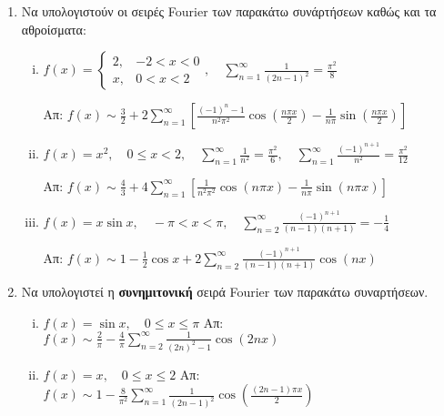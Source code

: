 \begin{enumerate}
  \item Να υπολογιστούν οι σειρές Fourier των παρακάτω συνάρτήσεων καθώς και 
    τα αθροίσματα:
    \begin{enumerate}[i)]
      \item $ f(x) = 
        \begin{cases}
          2, & -2<x<0 \\
          x, & 0<x<2
        \end{cases}, \quad \sum_{n=1}^{\infty} \frac{1}{(2n-1)^{2}} = \frac{\pi ^{2}}{8}$

        \hfill Απ: $ f(x) \sim \frac{3}{2} + 2 \sum_{n=1}^{\infty}
        \left[\frac{(-1)^{n}-1}{n^{2} \pi ^{2}} \cos{\left(\frac{n \pi x}{2}\right)}  - 
        \frac{1}{n \pi} \sin{\left(\frac{n \pi x}{2}\right)}\right] $  

      \item $ f(x) = x^{2}, \quad 0 \leq x < 2, \quad \sum_{n=1}^{\infty}
        \frac{1}{n^{2}} = \frac{\pi^{2}}{6}, \quad \sum_{n=1}^{\infty}
        \frac{(-1)^{n+1}}{n^{2}} = \frac{\pi ^{2}}{12} $

        \hfill Απ: $ f(x) \sim \frac{4}{3} + 4 \sum_{n=1}^{\infty} 
        \left[\frac{1}{n^{2} \pi ^{2}} \cos{(n \pi x )} - \frac{1}{n \pi}
        \sin{(n \pi x)}\right] $ 

      \item $ f(x) = x \sin{x}, \quad - \pi < x < \pi, \quad \sum_{n=2}^{\infty}
    \frac{(-1)^{n+1}}{(n-1)(n+1)} = - \frac{1}{4} $

    \hfill Απ: $ f(x) \sim 1 - \frac{1}{2} \cos{x} + 2\sum_{n=2}^{\infty}
    \frac{(-1)^{n+1}}{(n-1)(n+1)} \cos{(nx)} $ 
    \end{enumerate}

  \item Να υπολογιστεί η \textbf{συνημιτονική} σειρά Fourier των παρακάτω συναρτήσεων.
    \begin{enumerate}[i)]
      \item $ f(x) = \sin{x} , \quad 0 \leq x \leq \pi $ 
        \hfill Απ: $ f(x) \sim \frac{2}{\pi} - \frac{4}{\pi} \sum_{n=2}^{\infty}
        \frac{1}{(2n)^{2}-1} \cos{(2nx)} $ 
       \item $ f(x) = x, \quad 0 \leq x \leq 2 $ 
         \hfill Απ: $ f(x) \sim 1 - \frac{8}{\pi ^{2}} \sum_{n=1}^{\infty}
         \frac{1}{(2n-1)^{2}} \cos{\left(\frac{(2n-1) \pi x}{2}\right)} $ 
    \end{enumerate}


\end{enumerate}
